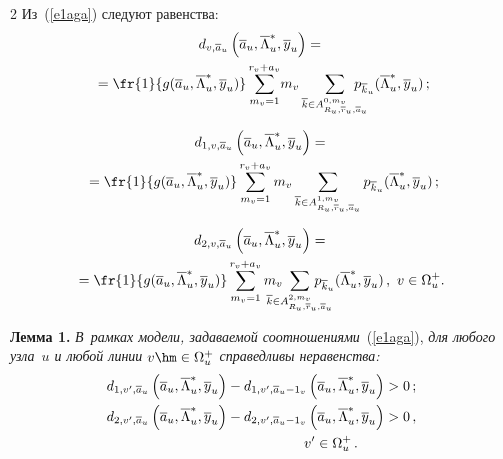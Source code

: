 \begin{multicols}{2}
     Из~(\ref{e1aga}) следуют равенства:
     \begin{multline}
     d_{v,\overline{a}_u} \left( \overline{a}_u, \overline{\Lambda}_u^*, 
\overline{y}_u\right) ={}\\
{}= \fr{1}{g(\overline{a}_u, \overline{\Lambda}_u^*, 
\overline{y}_u)}\sum\limits_{m_v=1}^{r_v+a_v}\! m_v
\sum\limits_{\overline{k}\in A^{0,m_v}_{R_u, \overline{r}_u, 
\overline{a}_u} } \!\!\!\!\!\!\! p_{\overline{k}_u}(\overline{\Lambda}_u^*,\overline{y}_u)\,; 
     \label{e5aga}
     \end{multline}
     
     \vspace*{-9pt}
     
     \noindent
     \begin{multline*}
     d_{1,v,\overline{a}_u} \left( \overline{a}_u, \overline{\Lambda}_u^*, 
\overline{y}_u\right) ={}\\
{}= \fr{1}{g(\overline{a}_u, \overline{\Lambda}_u^*, 
\overline{y}_u)}\sum\limits_{m_v=1}^{r_v+a_v} m_v
\sum\limits_{\overline{k}\in A^{1,m_v}_{R_u, \overline{r}_u, 
\overline{a}_u} }  p_{\overline{k}_u}(\overline{\Lambda}_u^*,\overline{y}_u)\,; 
\end{multline*}

\vspace*{-9pt}

\noindent
\begin{multline*}
     d_{2,v, \overline{a}_u} \left( \overline{a}_u, \overline{\Lambda}_u^*, 
\overline{y}_u\right) ={}\\
\hspace*{-3pt}{}= \fr{1}{g(\overline{a}_u, \overline{\Lambda}_u^*, 
\overline{y}_u)}\sum\limits_{m_v=1}^{r_v+a_v} m_v
\!\!\!\!\!\!\!\!\sum\limits_{\overline{k}\in A^{2,m_v}_{R_u, \overline{r}_u, 
\overline{a}_u} } \!\!\!\!\!\!\!\!\! p_{\overline{k}_u}(\overline{\Lambda}_u^*,\overline{y}_u)\,, 
\ v\in\Omega_u^+.
\end{multline*}
     
     \noindent
     \textbf{Лемма 1.} \textit{В~рамках модели, задаваемой 
соотношениями}~(\ref{e1aga}), \textit{для любого узла~$u$ и любой линии 
$v\hm\in\Omega_u^+$ справедливы неравенства:}
     \begin{gather*}
     d_{1,v^\prime, \overline{a}_{u}}\left( \overline{a}_u, 
\overline{\Lambda}_u^*, \overline{y}_u\right) -d_{1,v^\prime, \overline{a}_u-
1_v}\left( \overline{a}_u, \overline{\Lambda}_u^*, 
\overline{y}_u\right)>0\,;\\
 d_{2,v^\prime, \overline{a}_{u}}\left( \overline{a}_u, 
\overline{\Lambda}_u^*, \overline{y}_u\right) -d_{2,v^\prime, \overline{a}_u-
1_v}\left( \overline{a}_u, \overline{\Lambda}_u^*, 
\overline{y}_u\right)>0\,,\\
\hspace*{35mm}v^\prime\in \Omega_u^+\,.
     \end{gather*}
     

\end{multicols}
